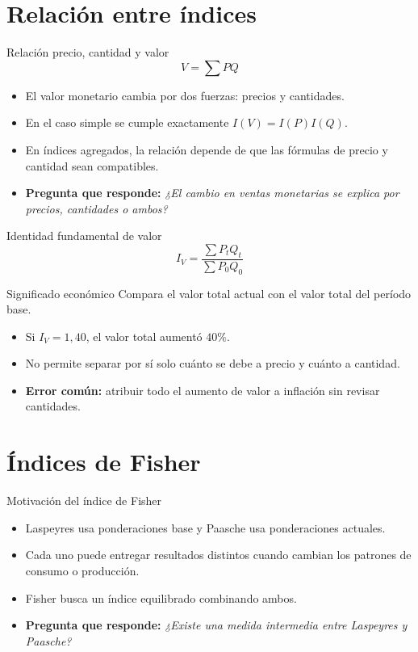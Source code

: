 \documentclass[aspectratio=169,11pt]{beamer}
\newcommand{\pregunta}[1]{\textbf{Pregunta que responde:} \emph{#1}}
\newcommand{\errorcomun}[1]{\textbf{Error común:} #1}
\begin{document}
\section{Relación entre índices}

\begin{frame}{Relación precio, cantidad y valor}
\[
V=\sum PQ
\]
\begin{itemize}
  \item El valor monetario cambia por dos fuerzas: precios y cantidades.
  \item En el caso simple se cumple exactamente $I(V)=I(P)I(Q)$.
  \item En índices agregados, la relación depende de que las fórmulas de precio y cantidad sean compatibles.
  \item \pregunta{¿El cambio en ventas monetarias se explica por precios, cantidades o ambos?}
\end{itemize}
\end{frame}

\begin{frame}{Identidad fundamental de valor}
\[
I_V=\frac{\sum P_tQ_t}{\sum P_0Q_0}
\]
\begin{block}{Significado económico}
Compara el valor total actual con el valor total del período base.
\end{block}
\begin{itemize}
  \item Si $I_V=1{,}40$, el valor total aumentó $40\%$.
  \item No permite separar por sí solo cuánto se debe a precio y cuánto a cantidad.
  \item \errorcomun{atribuir todo el aumento de valor a inflación sin revisar cantidades.}
\end{itemize}
\end{frame}

\section{Índices de Fisher}

\begin{frame}{Motivación del índice de Fisher}
\begin{itemize}
  \item Laspeyres usa ponderaciones base y Paasche usa ponderaciones actuales.
  \item Cada uno puede entregar resultados distintos cuando cambian los patrones de consumo o producción.
  \item Fisher busca un índice equilibrado combinando ambos.
  \item \pregunta{¿Existe una medida intermedia entre Laspeyres y Paasche?}
\end{itemize}
\end{frame}
\end{document}

